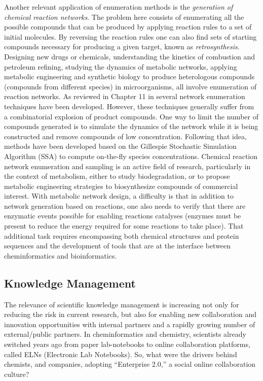 \documentclass{sig-alternate}
\begin{document}
Another relevant application of enumeration methods is the
\emph{generation of chemical reaction networks}. The problem here
consists of enumerating all the possible compounds that can be
produced by applying reaction rules to a set of initial molecules. By
reversing the reaction rules one can also find sets of starting
compounds necessary for producing a given target, known as
\emph{retrosynthesis}. Designing new drugs or chemicals, understanding
the kinetics of combustion and petroleum refining, studying the
dynamics of metabolic networks, applying metabolic engineering and
synthetic biology to produce heterologous compounds (compounds from
different species) in microorganisms, all involve enumeration of
reaction networks. As reviewed in Chapter 11 in \cite{faulon2010}
several network enumeration techniques have been developed. However,
these techniques generally suffer from a combinatorial explosion of
product compounds. One way to limit the number of compounds generated
is to simulate the dynamics of the network while it is being
constructed and remove compounds of low concentration. Following that
idea, methods have been developed based on the Gillespie Stochastic
Simulation Algorithm (SSA) to compute on-the-fly species
concentrations. Chemical reaction network enumeration and sampling is
an active field of research, particularly in the context of
metabolism, either to study biodegradation, or to propose metabolic
engineering strategies to biosynthesize compounds of commercial
interest. With metabolic network design, a difficulty is that in
addition to network generation based on reactions, one also needs to
verify that there are enzymatic events possible for enabling reactions
catalyses (enzymes must be present to reduce the
energy required for some reactions to take place). That additional
task requires encompassing both chemical structures and protein
sequences and the development of tools that are at the
interface between cheminformatics and bioinformatics.


\subsection{Knowledge Management}
\label{sec:knowledge-management}

The relevance of scientific knowledge management is increasing not
only for reducing the risk in current research, but also for enabling
new collaboration and innovation opportunities with internal partners and
a rapidly growing number of external/public partners. In
cheminformatics and chemistry, scientists already switched years
ago from paper lab-notebooks to online collaboration platforms, called
ELNs (Electronic Lab Notebooks). So, what were the drivers behind
chemists, and companies, adopting ``Enterprise 2.0,'' a social online
collaboration culture?
\end{document}
